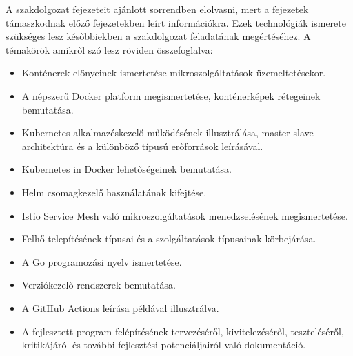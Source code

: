 A szakdolgozat fejezeteit ajánlott sorrendben elolvasni, mert a fejezetek támaszkodnak előző fejezetekben leírt információkra.
Ezek technológiák ismerete szükséges lesz későbbiekben a szakdolgozat feladatának megértéséhez.
A témakörök amikről szó lesz röviden összefoglalva:
\begin{itemize}
    \item Konténerek előnyeinek ismertetése mikroszolgáltatások üzemeltetésekor.
    \item A népszerű Docker platform megismertetése, konténerképek rétegeinek bemutatása.
    \item Kubernetes alkalmazéskezelő működésének illusztrálása, master-slave architektúra és a különböző típusú erőforrások leírásával.
    \item Kubernetes in Docker lehetőségeinek bemutatása.
    \item Helm csomagkezelő használatának kifejtése.
    \item Istio Service Mesh való mikroszolgáltatások menedzselésének megismertetése.
    \item Felhő telepítésének típusai és a szolgáltatások típusainak körbejárása.
    \item A Go programozási nyelv ismertetése.
    \item Verziókezelő rendszerek bemutatása.
    \item A GitHub Actions leírása példával illusztrálva.
    \item A fejlesztett program felépítésének tervezéséről, kivitelezéséről, teszteléséről, kritikájáról és további fejlesztési potenciáljairól való dokumentáció.
\end{itemize}